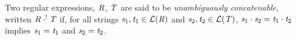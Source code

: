 \documentclass[numbers,10pt,preprint\ifanon ,nocopyrightspace\fi]{sigplanconf}
\begin{document}
%
%
%

Two regular expressions, $\mathit{R}$, $\mathit{T}$ are said to be 
\textit{unambiguously concatenable}, written
$\mathit{R}\cdot^!\mathit{T}$ if, 
for all strings $\mathit{s}_1,\mathit{t}_1\in\mathcal{L}(\mathit{R})$ and
$\mathit{s}_2,\mathit{t}_2\in\mathcal{L}(\mathit{T})$,
$\mathit{s}_1\cdot\mathit{s}_2=\mathit{t}_1\cdot\mathit{t}_2$ implies
$\mathit{s}_1=\mathit{t}_1$ and $\mathit{s}_2=\mathit{t}_2$.
\end{document}
